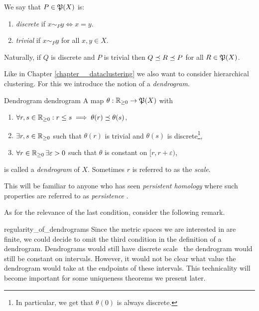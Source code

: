 \begin{definition}{}{}
We say that $P \in \P(X)$ is:
\begin{enumerate}
    \item \emph{discrete} if $x \sim_P y \iff x = y$.
    \item \emph{trivial} if $x \sim_P y$ for all $x,y \in X$.
\end{enumerate}
\end{definition}

Naturally, if $Q$ is discrete and $P$ is trivial then $Q \refines R \refines P$ for all $R \in \P(X)$.

Like in Chapter \ref{chapter__dataclustering} we also want to consider hierarchical clustering.
For this we introduce the notion of a \emph{dendrogram}.

\begin{definition}{Dendrogram \cite[Def.~2.2]{Carlsson2010}}{dendrogram}
A map $\theta: \R_{\geq0} \to \mathfrak{P}(X)$ with
\begin{enumerate}
    \item $\forall r,s \in \R_{\geq0}: r \leq s \implies  \theta(r) \refines \theta(s)$,
    \item $\exists r,s \in \R_{\geq0}$ such that $\theta(r)$ is trivial and $\theta(s)$ is discrete\footnote{In particular, we get that $\theta(0)$ is always discrete.},
    \item $\forall r \in \R_{\geq0} \,\exists \varepsilon > 0$ such that $\theta$ is constant on $[r, r + \varepsilon)$,
\end{enumerate}
is called a \emph{dendrogram} of $X$. Sometimes $r$ is referred to as the \emph{scale}.
\end{definition}

This will be familiar to anyone who has seen \emph{persistent homology} where such properties are referred to as \emph{persistence} \cite[Chap.~3]{Carlsson2014}.

As for the relevance of the last condition, consider the following remark.

\begin{myremark}{}{regularity_of_dendrograms}
Since the metric spaces we are interested in are finite, we could decide to omit the third condition in the definition of a dendrogram.
Dendrograms would still have discrete scale \ie\ the dendrogram would still be constant on intervals.
However, it would not be clear what value the dendrogram would take at the endpoints of these intervals.
This technicality will become important for some uniqueness theorems we present later.
\end{myremark}

